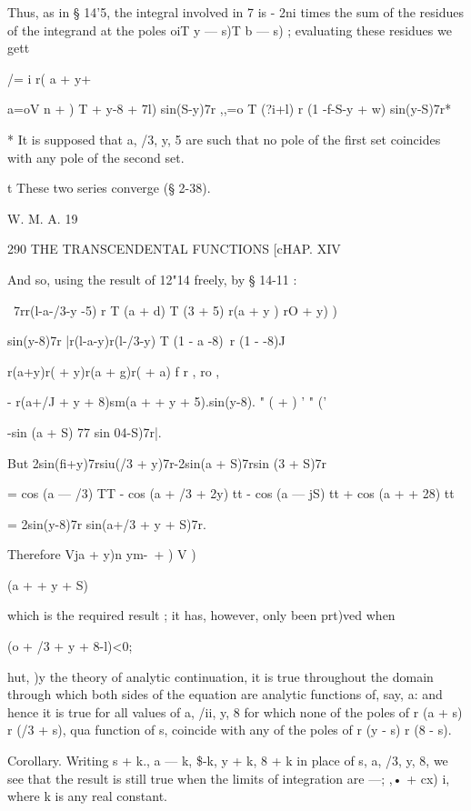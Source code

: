 Thus, as in § 14'5, the integral involved in 7 is - 2ni times the sum of the residues of the 
integrand at the poles oiT y — s)T b — s) ; evaluating these residues we gett 

/= i r( a + y+%



a=oV n +  ) T  + y-8 + 7l) sin(S-y)7r ,,=o T (?i+l) r (1 -f-S-y + w) sin(y-S)7r* 

* It is supposed that a, /3, y, 5 are such that no pole of the first set coincides with any pole 
of the second set. 

t These two series converge (§ 2-38). 

W. M. A. 19 



290 THE TRANSCENDENTAL FUNCTIONS [cHAP. XIV 

And so, using the result of   12"14 freely, by § 14-11 : 

\  7rr(l-a-/3-y -5) r T (a + d) T (3 + 5) r(a + y ) rO + y) ) 

sin(y-8)7r |r(l-a-y)r(l-/3-y) T (1 - a -8)~r (1 -  -8)J 

r(a+y)r(  + y)r(a + g)r(  + a) f   r   ,   ro  , 

- r(a+/J + y + 8)sm(a +   + y + 5).sin(y-8).  "  (  +  )   ' "  ('    

-sin (a + S) 77 sin 04-S)7r|. 

But 2sin(fi+y)7rsiu(/3 + y)7r-2sin(a + S)7rsin (3 + S)7r 

= cos (a — /3) TT - cos (a + /3 + 2y) tt - cos (a — jS) tt + cos (a +   + 28) tt 

= 2sin(y-8)7r sin(a+/3 + y + S)7r. 

Therefore  Vja + y)n ym-\ + ) V     ) 

 (a +   + y + S) 

which is the required result ; it has, however, only been prt)ved when 

 (o + /3 + y + 8-l)<0; 

hut,  )y the theory of analytic continuation, it is true throughout the domain through 
which both sides of the equation are analytic functions of, say, a: and hence it is true for 
all values of a, /ii, y, 8 for which none of the poles of r (a + s) r (/3 + s), qua function of s, 
coincide with any of the poles of r (y - s) r (8 - s). 

Corollary. Writing s + k., a — k, \$-k, y + k, 8 + k in place of s, a, /3, y, 8, we see that 
the result is still true when the limits of integration are —; ,• + cx) i, where k is any real 
constant. 

